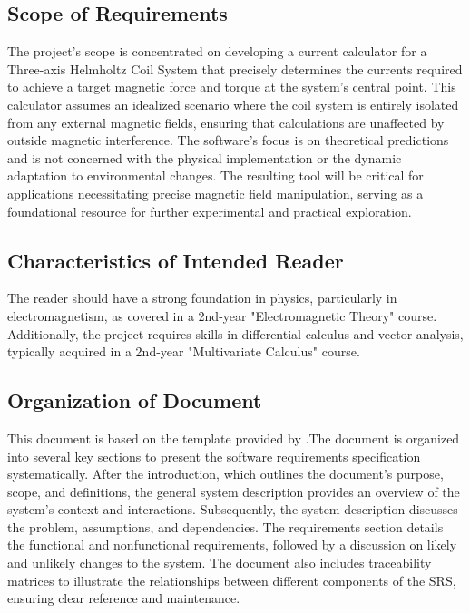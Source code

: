 \documentclass[12pt]{article}
\begin{document}
\subsection{Scope of Requirements} 
{
The project's scope is concentrated on developing a current calculator for a Three-axis Helmholtz Coil System that precisely determines the currents required to achieve a target magnetic force and torque at the system's central point. This calculator assumes an idealized scenario where the coil system is entirely isolated from any external magnetic fields, ensuring that calculations are unaffected by outside magnetic interference. The software's focus is on theoretical predictions and is not concerned with the physical implementation or the dynamic adaptation to environmental changes. The resulting tool will be critical for applications necessitating precise magnetic field manipulation, serving as a foundational resource for further experimental and practical exploration.
}  

\subsection{Characteristics of Intended Reader} \label{sec_IntendedReader}
{
The reader should have a strong foundation in physics, particularly in electromagnetism, as covered in a 2nd-year "Electromagnetic Theory" course. Additionally, the project requires skills in differential calculus and vector analysis, typically acquired in a 2nd-year "Multivariate Calculus" course.
}

\subsection{Organization of Document}
{
This document is based on the template provided by \citet{SmithandLai2005}.The document is organized into several key sections to present the software requirements specification systematically. After the introduction, which outlines the document's purpose, scope, and definitions, the general system description provides an overview of the system's context and interactions. Subsequently, the system description discusses the problem, assumptions, and dependencies. The requirements section details the functional and nonfunctional requirements, followed by a discussion on likely and unlikely changes to the system. The document also includes traceability matrices to illustrate the relationships between different components of the SRS, ensuring clear reference and maintenance.
}
\end{document}
